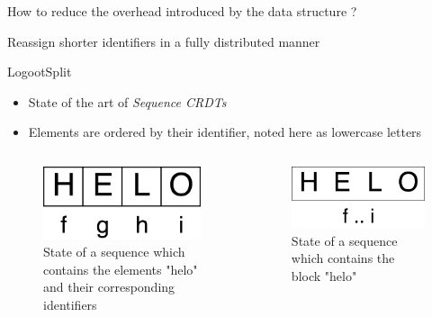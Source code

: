 \documentclass[10pt]{beamer}
\begin{document}
\begin{frame}[standout]
  \alert{How to reduce the overhead introduced by the data structure ?}

  \bigskip
  \pause

  Reassign shorter identifiers in a fully distributed manner
\end{frame}

\begin{frame}{LogootSplit }
  \begin{itemize}
    \item State of the art of \emph{Sequence \acp{CRDT}}
    \item Elements are ordered by their identifier, noted here as lowercase letters
  \end{itemize}

  \pause

  \begin{columns}
    \begin{column}{0.5\textwidth}
      \begin{figure}
        \includegraphics[scale=0.15]{img/helo-as-letters.png}
        \caption{State of a sequence which contains the elements "helo" and their corresponding identifiers}
      \end{figure}
    \end{column}
    \pause
    \begin{column}{0.5\textwidth}
      \begin{figure}
        \includegraphics[scale=0.15]{img/helo-as-block.png}
        \caption{State of a sequence which contains the block "helo"}
      \end{figure}
    \end{column}
  \end{columns}
\end{frame}
\end{document}
